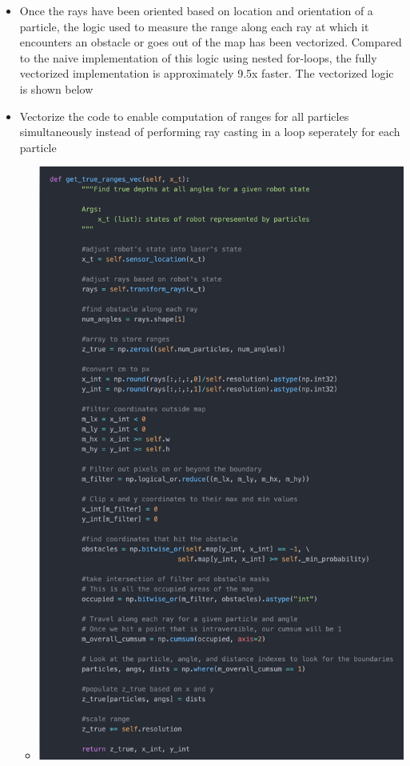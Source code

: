 \documentclass[12pt, a4paper]{article}
\begin{document}
\begin{itemize}
\begin{itemize}
\begin{minipage}[t]{\linewidth}
\begin{center}
        \label{fig:sm_1}
      \end{center}
    \end{minipage}
  \end{itemize}
  \item Once the rays have been oriented based on location and orientation of a particle, the logic used to measure the range along each ray at which it encounters an obstacle or goes out of the map has been vectorized. Compared to the naive implementation of this logic using nested for-loops, the fully vectorized implementation is approximately 9.5x faster.  The vectorized logic is shown below
  \item Vectorize the code to enable computation of ranges for all particles simultaneously instead of performing ray casting in a loop seperately for each particle
  \begin{itemize}
    \item 
    \begin{minipage}[t]{\linewidth}
      \vspace{0pt}
      \begin{center}
        \includegraphics[scale=0.3]{./results/ray_casting_opt_2.png}

\end{center}
\end{minipage}
\end{itemize}
\end{itemize}
\end{document}
